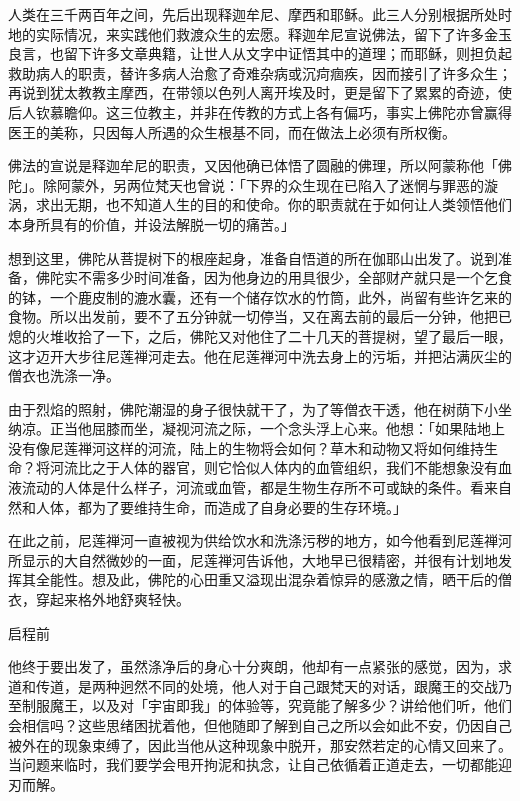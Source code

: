 \documentclass[12pt,twoside,openany]{book}
\begin{document}
人类在三千两百年之间，先后出现释迦牟尼、摩西和耶稣。此三人分别根据所处时地的实际情况，来实践他们救渡众生的宏愿。释迦牟尼宣说佛法，留下了许多金玉良言，也留下许多文章典籍，让世人从文字中证悟其中的道理；而耶稣，则担负起救助病人的职责，替许多病人治愈了奇难杂病或沉疴痼疾，因而接引了许多众生；再说到犹太教教主摩西，在带领以色列人离开埃及时，更是留下了累累的奇迹，使后人钦慕瞻仰。这三位教主，并非在传教的方式上各有偏巧，事实上佛陀亦曾赢得医王的美称，只因每人所遇的众生根基不同，而在做法上必须有所权衡。

佛法的宣说是释迦牟尼的职责，又因他确已体悟了圆融的佛理，所以阿蒙称他「佛陀」。除阿蒙外，另两位梵天也曾说：「下界的众生现在已陷入了迷惘与罪恶的漩涡，求出无期，也不知道人生的目的和使命。你的职责就在于如何让人类领悟他们本身所具有的价值，并设法解脱一切的痛苦。」

想到这里，佛陀从菩提树下的根座起身，准备自悟道的所在伽耶山出发了。说到准备，佛陀实不需多少时间准备，因为他身边的用具很少，全部财产就只是一个乞食的钵，一个鹿皮制的漉水囊，还有一个储存饮水的竹筒，此外，尚留有些许乞来的食物。所以出发前，要不了五分钟就一切停当，又在离去前的最后一分钟，他把已熄的火堆收拾了一下，之后，佛陀又对他住了二十几天的菩提树，望了最后一眼，这才迈开大步往尼莲禅河走去。他在尼莲禅河中洗去身上的污垢，并把沾满灰尘的僧衣也洗涤一净。

由于烈焰的照射，佛陀潮湿的身子很快就干了，为了等僧衣干透，他在树荫下小坐纳凉。正当他屈膝而坐，凝视河流之际，一个念头浮上心来。他想：「如果陆地上没有像尼莲禅河这样的河流，陆上的生物将会如何？草木和动物又将如何维持生命？将河流比之于人体的器官，则它恰似人体内的血管组织，我们不能想象没有血液流动的人体是什么样子，河流或血管，都是生物生存所不可或缺的条件。看来自然和人体，都为了要维持生命，而造成了自身必要的生存环境。」

在此之前，尼莲禅河一直被视为供给饮水和洗涤污秽的地方，如今他看到尼莲禅河所显示的大自然微妙的一面，尼莲禅河告诉他，大地早已很精密，并很有计划地发挥其全能性。想及此，佛陀的心田重又溢现出混杂着惊异的感激之情，晒干后的僧衣，穿起来格外地舒爽轻快。

启程前

他终于要出发了，虽然涤净后的身心十分爽朗，他却有一点紧张的感觉，因为，求道和传道，是两种迥然不同的处境，他人对于自己跟梵天的对话，跟魔王的交战乃至制服魔王，以及对「宇宙即我」的体验等，究竟能了解多少？讲给他们听，他们会相信吗？这些思绪困扰着他，但他随即了解到自己之所以会如此不安，仍因自己被外在的现象束缚了，因此当他从这种现象中脱开，那安然若定的心情又回来了。当问题来临时，我们要学会甩开拘泥和执念，让自己依循着正道走去，一切都能迎刃而解。
\end{document}
